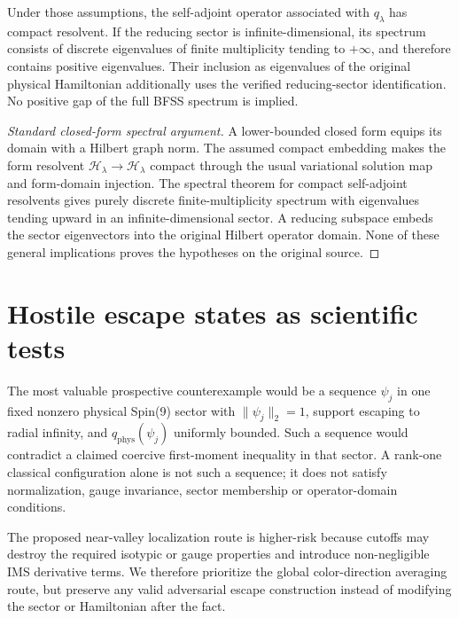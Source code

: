 \begin{proposition}
\label{prop:conditional-spectrum}
Under those assumptions, the self-adjoint operator associated with
$q_\lambda$ has compact resolvent. If the reducing sector is
infinite-dimensional, its spectrum consists of discrete eigenvalues
of finite multiplicity tending to $+\infty$, and therefore contains
positive eigenvalues. Their inclusion as eigenvalues of the original
physical Hamiltonian additionally uses the verified reducing-sector
identification. No positive gap of the full BFSS spectrum is implied.
\end{proposition}
\begin{proof}[Standard closed-form spectral argument]
A lower-bounded closed form equips its domain with a Hilbert graph
norm. The assumed compact embedding makes the form resolvent
$\mathcal H_\lambda\to\mathcal H_\lambda$ compact through the
usual variational solution map and form-domain injection.
The spectral theorem for compact self-adjoint resolvents gives
purely discrete finite-multiplicity spectrum with eigenvalues
tending upward in an infinite-dimensional sector. A reducing
subspace embeds the sector eigenvectors into the original Hilbert
operator domain. None of these general implications proves the
hypotheses on the original source.
\end{proof}

\section{Hostile escape states as scientific tests}
The most valuable prospective counterexample would be a sequence
$\psi_j$ in one fixed nonzero physical Spin(9) sector with
$\|\psi_j\|_2=1$, support escaping to radial infinity, and
$q_{\mathrm{phys}}(\psi_j)$ uniformly bounded. Such a sequence
would contradict a claimed coercive first-moment inequality in that
sector. A rank-one classical configuration alone is not such a
sequence; it does not satisfy normalization, gauge invariance,
sector membership or operator-domain conditions.

The proposed near-valley localization route is higher-risk because
cutoffs may destroy the required isotypic or gauge properties and
introduce non-negligible IMS derivative terms. We therefore prioritize
the global color-direction averaging route, but preserve any valid
adversarial escape construction instead of modifying the sector or
Hamiltonian after the fact.

